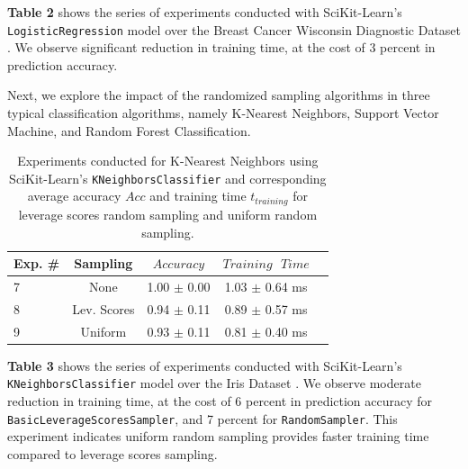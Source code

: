 \documentclass{article}
\theoremstyle{plain}
\theoremstyle{definition}
\theoremstyle{remark}
\begin{document}
\textbf{Table 2} shows the series of experiments conducted with SciKit-Learn's \texttt{LogisticRegression} model over the Breast Cancer Wisconsin Diagnostic Dataset \cite{breastcancer}. We observe significant reduction in training time, at the cost of 3 percent in prediction accuracy.

Next, we explore the impact of the randomized sampling algorithms in three typical classification algorithms, namely K-Nearest Neighbors, Support Vector Machine, and Random Forest Classification.

\begin{table}[t]
	\caption{Experiments conducted for K-Nearest Neighbors using SciKit-Learn's \texttt{KNeighborsClassifier} and corresponding average accuracy $Acc$ and training time $t_{training}$ for leverage scores random sampling and uniform random sampling.}
	\label{t3}
	\vskip 0.15in
	\begin{center}
		\begin{small}
			\begin{sc}
				\begin{tabular}{lcccr}
					\toprule
					Exp. \# & Sampling & $Accuracy$ & $Training \text{ } Time$\\
					\midrule
					7 & None & 1.00 $\pm$ 0.00 & 1.03 $\pm$ 0.64 ms \\
					8 & Lev. Scores & 0.94 $\pm$ 0.11 & 0.89 $\pm$ 0.57 ms \\
					9 & Uniform & 0.93 $\pm$ 0.11 & 0.81 $\pm$ 0.40 ms \\
					\bottomrule
				\end{tabular}
			\end{sc}
		\end{small}
	\end{center}
	\vskip -0.1in
\end{table}

\textbf{Table 3} shows the series of experiments conducted with SciKit-Learn's \texttt{KNeighborsClassifier} model over the Iris Dataset \cite{iris}. We observe moderate reduction in training time, at the cost of 6 percent in prediction accuracy for \texttt{BasicLeverageScoresSampler}, and 7 percent for \texttt{RandomSampler}. This experiment indicates uniform random sampling provides faster training time compared to leverage scores sampling.
\end{document}

